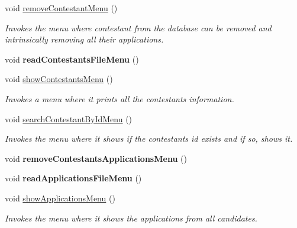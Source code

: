 \begin{DoxyCompactItemize}
void \hyperlink{class_company_m_s_ae02ea0e36a16b4dd6b1674a39e60d10c}{remove\+Contestant\+Menu} ()
\begin{DoxyCompactList}\small\item\em Invokes the menu where contestant from the database can be removed and intrinsically removing all their applications. \end{DoxyCompactList}\item 
\mbox{\label{class_company_m_s_a3060452ed3bcd57971498904a194e2e0}} 
void {\bfseries read\+Contestants\+File\+Menu} ()
\item 
\mbox{\label{class_company_m_s_a001d765e81d7fa77b6e0a85830a80bd8}} 
void \hyperlink{class_company_m_s_a001d765e81d7fa77b6e0a85830a80bd8}{show\+Contestants\+Menu} ()
\begin{DoxyCompactList}\small\item\em Invokes a menu where it prints all the contestants information. \end{DoxyCompactList}\item 
\mbox{\label{class_company_m_s_ad2336375a236140627b122b0cd37947e}} 
void \hyperlink{class_company_m_s_ad2336375a236140627b122b0cd37947e}{search\+Contestant\+By\+Id\+Menu} ()
\begin{DoxyCompactList}\small\item\em Invokes the menu where it shows if the contestant\textquotesingle{}s id exists and if so, show\textquotesingle{}s it. \end{DoxyCompactList}\item 
\mbox{\label{class_company_m_s_a513713ab0be9f6db590507db36638cc6}} 
void {\bfseries remove\+Contestants\+Applications\+Menu} ()
\item 
\mbox{\label{class_company_m_s_a04e67c8427290afa8259c4c676b31111}} 
void {\bfseries read\+Applications\+File\+Menu} ()
\item 
\mbox{\label{class_company_m_s_ad2447b5f8b8a0e7d7b1beb5662674850}} 
void \hyperlink{class_company_m_s_ad2447b5f8b8a0e7d7b1beb5662674850}{show\+Applications\+Menu} ()
\begin{DoxyCompactList}\small\item\em Invokes the menu where it shows the applications from all candidates. \end{DoxyCompactList}\item 

\end{DoxyCompactItemize}
